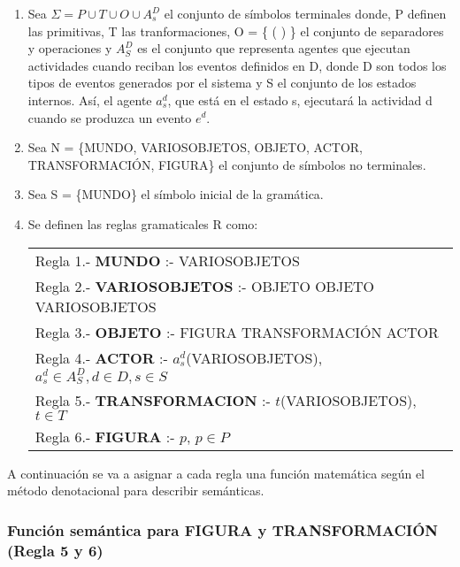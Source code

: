\documentclass[runningheads]{llncs}
\begin{document}
\begin{enumerate}

\item Sea $\Sigma=P\cup T\cup O\cup A_{s}^{D}$ el conjunto de s\'imbolos terminales donde, P definen las primitivas, T las tranformaciones, O = \{ {\textperiodcentered} ( ) \} el conjunto de separadores y operaciones y $A^{D}_{S}$ es el conjunto que representa agentes que ejecutan actividades cuando reciban los eventos definidos en D, donde D son todos los tipos de eventos generados por el sistema y S el conjunto de los estados internos. As\'i, el agente $a_{s}^{d}$, que est\'a en el estado s, ejecutar\'a la actividad d cuando se produzca un evento $e^{d}$.
	
\item Sea N = \{MUNDO, VARIOSOBJETOS, OBJETO, ACTOR, TRANSFORMACI\'ON, FIGURA\} el conjunto de s\'imbolos no terminales.

\item Sea S = \{MUNDO\} el s\'imbolo inicial de la gram\'atica.

\item Se definen las reglas gramaticales R como:

		\begin{center}
			\begin{tabular}{|l|}
				\hline
					Regla 1.- \textbf{MUNDO} :- VARIOSOBJETOS \\
					Regla 2.- \textbf{VARIOSOBJETOS} :- OBJETO {\textbar} OBJETO {\textperiodcentered} VARIOSOBJETOS\\
					Regla 3.- \textbf{OBJETO} :- FIGURA {\textbar} TRANSFORMACI\'ON {\textbar} ACTOR\\
					Regla 4.- \textbf{ACTOR} :- $a^{d}_{s}$(VARIOSOBJETOS), $a^{d}_{s} \in A^{D}_{S}, d \in D, s \in S$\\
					Regla 5.- \textbf{TRANSFORMACION} :- $t$(VARIOSOBJETOS), $t \in T$\\
					Regla 6.- \textbf{FIGURA} :- $p$, $p \in P$\\
				\hline
			\end{tabular}
		\end{center}

\end{enumerate}

A continuaci\'on se va a asignar a cada regla una funci\'on matem\'atica seg\'un el m\'etodo denotacional para describir sem\'anticas.

\subsubsection{Funci\'on sem\'antica para FIGURA y TRANSFORMACI\'ON (Regla 5 y 6)\label{sec:FuncionPrimitiva}}
\end{document}
